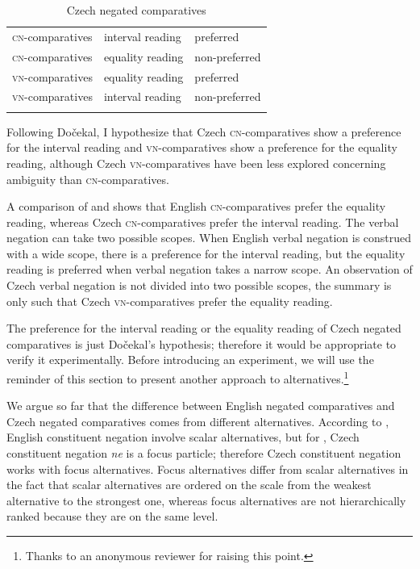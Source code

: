 \documentclass[output=paper,
]{langscibook}
\begin{document}
\begin{table}
\caption{Czech negated comparatives}
\label{tab:2:cz_comp}
 \begin{tabular}{lll} 
  \lsptoprule
    \textsc{cn-}comparatives & interval reading & preferred\\
  \textsc{cn-}comparatives & equality reading & non-preferred\\
   \textsc{vn-}comparatives & equality reading & preferred\\
  \textsc{vn-}comparatives & interval reading & non-preferred\\  \lspbottomrule 
  \end{tabular}
  \end{table}


Following Dočekal, I hypothesize that Czech \textsc{cn-}comparatives show a preference for the interval reading and \textsc{vn-}comparatives show a preference for the equality reading, although Czech \textsc{vn-}comparatives have been less explored concerning ambiguity than \textsc{cn-}comparatives. 

A comparison of  and  shows that English \textsc{cn-}comparatives prefer the equality reading, whereas Czech \textsc{cn-}comparatives prefer the interval reading. The verbal negation can take two possible scopes. When English verbal negation is construed with a wide scope, there is a preference for the interval reading, but the equality reading is preferred when verbal negation takes a narrow scope. An observation of Czech verbal negation is not divided into two possible scopes, the summary is only such that Czech \textsc{vn-}comparatives prefer the equality reading.

The preference for the interval reading or the equality reading of Czech negated comparatives is just Dočekal's hypothesis; therefore it would be appropriate to verify it experimentally. Before introducing an experiment, we will use the reminder of this section to present another approach to alternatives.\footnote{Thanks to an anonymous reviewer for raising this point.}

We argue so far that the difference between English negated comparatives and Czech negated comparatives comes from different alternatives. According to \cite{nouwen2008upper}, English constituent negation involve scalar alternatives, but for \cite{dovcekal2017upper}, Czech constituent negation \textit{ne} is a focus particle; therefore Czech constituent negation works with focus alternatives. Focus alternatives differ from scalar alternatives in the fact that scalar alternatives are ordered on the scale from the weakest alternative to the strongest one, whereas focus alternatives are not hierarchically ranked because they are on the same level. 
\end{document}
